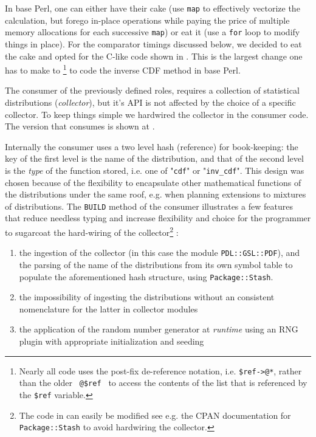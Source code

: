\documentclass[10pt]{article}
\begin{document}
In base Perl, one can either have their cake (use \texttt{map} to effectively vectorize the calculation, but forego in-place operations while paying the price of multiple memory allocations for each successive \texttt{map}) or eat it (use a \texttt{for} loop to modify things in place). For the comparator timings discussed below, we decided to eat the cake and opted for the C-like code shown in . This is the largest change one has to make to \footnote{Nearly all code uses the post-fix de-reference notation, i.e. \texttt{\$ref->@*}, rather than the older \texttt{ @{\$ref} } to access the contents of the list that is referenced by the \texttt{\$ref} variable.} to code the inverse CDF method in base Perl. 



The consumer of the previously defined roles, requires a collection of statistical distributions (\textit{collector}), but it's API is not affected by the choice of a specific collector. To keep things simple we hardwired the collector in the consumer code. The version that consumes  is shown at . 


Internally the consumer uses a two level hash (reference) for book-keeping: the key of the first level is the name of the distribution, and that of the second level is the \textit{type} of the function stored, i.e. one of "\texttt{cdf}" or "\texttt{inv\_cdf}". This design was chosen because of the flexibility to encapsulate other mathematical functions of the distributions under the same roof, e.g. when planning extensions to mixtures of distributions. The \texttt{BUILD} method of the consumer illustrates a few features that reduce needless typing and increase flexibility and choice for the programmer to sugarcoat the hard-wiring of the collector\footnote{The code in  can easily be modified see e.g.  the CPAN documentation for \texttt{Package::Stash} to avoid hardwiring the collector.} :
\begin{enumerate}
\item the ingestion of the collector (in this case the module \texttt{PDL::GSL::PDF}), and the parsing of the name of the distributions from its own symbol table to populate the aforementioned hash structure, using \texttt{Package::Stash}.
\item the impossibility of ingesting the distributions without an consistent nomenclature for the latter in collector modules
\item the application of the random number generator at \textit{runtime} using an RNG plugin with appropriate initialization and seeding
\end{enumerate}
\end{document}
